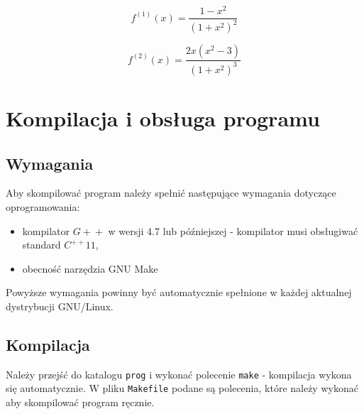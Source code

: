 \documentclass[a4paper,11pt]{article}
\begin{document}
      $$ f^{(1)}(x) = \frac{1-x^2}{(1+x^2)^2} $$
      \begin{center}
      \end{center}
      $$ f^{(2)}(x) = \frac{2x(x^2 - 3)}{(1+x^2)^3} $$
  \section{Kompilacja i obsługa programu}
    \subsection{Wymagania}
    Aby skompilować program należy spełnić następujące wymagania dotyczące oprogramowania:
    \begin{itemize}
      \item kompilator $ G\!+\!+ $ w wersji 4.7 lub późniejszej - kompilator musi obsługiwać standard $ C^{++}11 $,
      \item obecność narzędzia GNU Make
    \end{itemize}
    Powyższe wymagania powinny być automatycznie spełnione w każdej aktualnej dystrybucji GNU/Linux.
    
    \subsection{Kompilacja}
    Należy przejść do katalogu \texttt{prog} i wykonać polecenie \texttt{make} - kompilacja wykona się automatycznie. W pliku \texttt{Makefile} podane są polecenia, które należy wykonać aby skompilować program ręcznie.
    
\end{document}
